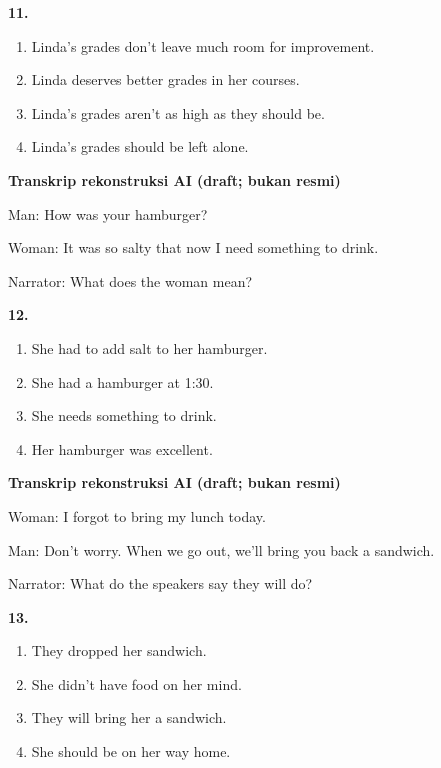 \documentclass[12pt]{article}
\begin{document}
\noindent\textbf{11.}
\begin{enumerate}[label=(\Alph*),leftmargin=*,itemsep=0.2em]
\item Linda's grades don't leave much room for improvement.
\item Linda deserves better grades in her courses.
\item Linda's grades aren't as high as they should be.
\item Linda's grades should be left alone.
\end{enumerate}
\par
\vspace{0.25\baselineskip}
\begin{exampleblock}
\textbf{Transkrip rekonstruksi AI (draft; bukan resmi)}\par
Man: How was your hamburger?\par
Woman: It was so salty that now I need something to drink.\par
Narrator: What does the woman mean?\par
\end{exampleblock}
\noindent\textbf{12.}
\begin{enumerate}[label=(\Alph*),leftmargin=*,itemsep=0.2em]
\item She had to add salt to her hamburger.
\item She had a hamburger at 1:30.
\item She needs something to drink.
\item Her hamburger was excellent.
\end{enumerate}
\par
\vspace{0.25\baselineskip}
\begin{exampleblock}
\textbf{Transkrip rekonstruksi AI (draft; bukan resmi)}\par
Woman: I forgot to bring my lunch today.\par
Man: Don't worry. When we go out, we'll bring you back a sandwich.\par
Narrator: What do the speakers say they will do?\par
\end{exampleblock}
\noindent\textbf{13.}
\begin{enumerate}[label=(\Alph*),leftmargin=*,itemsep=0.2em]
\item They dropped her sandwich.
\item She didn't have food on her mind.
\item They will bring her a sandwich.
\item She should be on her way home.
\end{enumerate}
\end{document}
